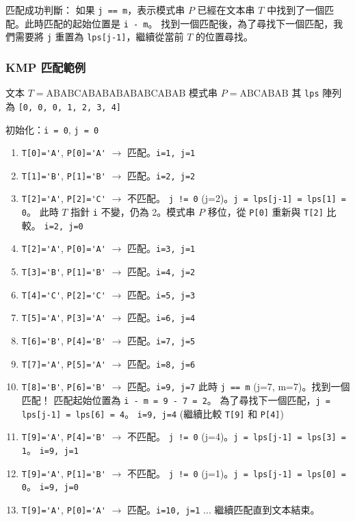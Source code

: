 匹配成功判斷：
如果 \verb|j == m|，表示模式串 $P$ 已經在文本串 $T$ 中找到了一個匹配。此時匹配的起始位置是 \verb|i - m|。
找到一個匹配後，為了尋找下一個匹配，我們需要將 \verb|j| 重置為 \verb|lps[j-1]|，繼續從當前 $T$ 的位置尋找。

\subsubsection{KMP 匹配範例}
文本 $T = \text{ABABCABABABABABCABAB}$
模式串 $P = \text{ABCABAB}$
其 \verb|lps| 陣列為 \verb|[0, 0, 0, 1, 2, 3, 4]|

初始化：\verb|i = 0|, \verb|j = 0|

\begin{enumerate}
    \item \verb|T[0]='A'|, \verb|P[0]='A'| $\rightarrow$ 匹配。\verb|i=1, j=1|
    \item \verb|T[1]='B'|, \verb|P[1]='B'| $\rightarrow$ 匹配。\verb|i=2, j=2|
    \item \verb|T[2]='A'|, \verb|P[2]='C'| $\rightarrow$ 不匹配。
    \verb|j != 0| (j=2)。\verb|j = lps[j-1] = lps[1] = 0|。
    此時 $T$ 指針 \verb|i| 不變，仍為 2。模式串 $P$ 移位，從 \verb|P[0]| 重新與 \verb|T[2]| 比較。
    \verb|i=2, j=0|

    \item \verb|T[2]='A'|, \verb|P[0]='A'| $\rightarrow$ 匹配。\verb|i=3, j=1|
    \item \verb|T[3]='B'|, \verb|P[1]='B'| $\rightarrow$ 匹配。\verb|i=4, j=2|
    \item \verb|T[4]='C'|, \verb|P[2]='C'| $\rightarrow$ 匹配。\verb|i=5, j=3|
    \item \verb|T[5]='A'|, \verb|P[3]='A'| $\rightarrow$ 匹配。\verb|i=6, j=4|
    \item \verb|T[6]='B'|, \verb|P[4]='B'| $\rightarrow$ 匹配。\verb|i=7, j=5|
    \item \verb|T[7]='A'|, \verb|P[5]='A'| $\rightarrow$ 匹配。\verb|i=8, j=6|
    \item \verb|T[8]='B'|, \verb|P[6]='B'| $\rightarrow$ 匹配。\verb|i=9, j=7|
    此時 \verb|j == m| (j=7, m=7)。找到一個匹配！
    匹配起始位置為 \verb|i - m = 9 - 7 = 2|。
    為了尋找下一個匹配，\verb|j = lps[j-1] = lps[6] = 4|。
    \verb|i=9, j=4| (繼續比較 \verb|T[9]| 和 \verb|P[4]|)

    \item \verb|T[9]='A'|, \verb|P[4]='B'| $\rightarrow$ 不匹配。
    \verb|j != 0| (j=4)。\verb|j = lps[j-1] = lps[3] = 1|。
    \verb|i=9, j=1|

    \item \verb|T[9]='A'|, \verb|P[1]='B'| $\rightarrow$ 不匹配。
    \verb|j != 0| (j=1)。\verb|j = lps[j-1] = lps[0] = 0|。
    \verb|i=9, j=0|

    \item \verb|T[9]='A'|, \verb|P[0]='A'| $\rightarrow$ 匹配。\verb|i=10, j=1|
    ... 繼續匹配直到文本結束。
\end{enumerate}

